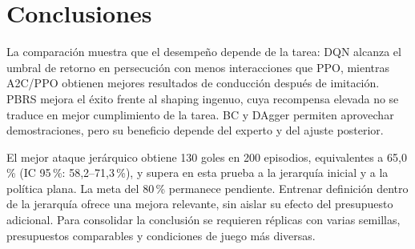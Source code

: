\section{Conclusiones}
La comparación muestra que el desempeño depende de la tarea: DQN alcanza el
umbral de retorno en persecución con menos interacciones que PPO, mientras
A2C/PPO obtienen mejores resultados de conducción después de imitación.
PBRS mejora el éxito frente al shaping ingenuo, cuya recompensa elevada no
se traduce en mejor cumplimiento de la tarea. BC y DAgger permiten aprovechar
demostraciones, pero su beneficio depende del experto y del ajuste posterior.

El mejor ataque jerárquico obtiene 130 goles en 200 episodios, equivalentes a
65,0\,\% (IC 95\,\%: 58,2--71,3\,\%), y supera en esta prueba a la jerarquía
inicial y a la política plana. La meta del 80\,\% permanece pendiente. Entrenar
definición dentro de la jerarquía ofrece una mejora relevante, sin aislar su
efecto del presupuesto adicional. Para consolidar la conclusión se requieren
réplicas con varias semillas, presupuestos comparables y condiciones de juego
más diversas.
